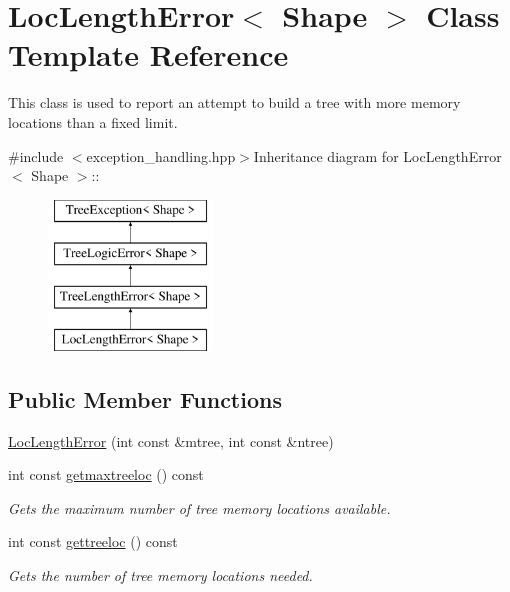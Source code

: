 \hypertarget{classLocLengthError}{
\section{LocLengthError$<$ Shape $>$ Class Template Reference}
\label{classLocLengthError}
}


This class is used to report an attempt to build a tree with more memory locations than a fixed limit.  


{\ttfamily \#include $<$exception\_\-handling.hpp$>$}Inheritance diagram for LocLengthError$<$ Shape $>$::\begin{figure}[H]
\begin{center}
\leavevmode
\includegraphics[height=4cm]{classLocLengthError}
\end{center}
\end{figure}
\subsection*{Public Member Functions}
\begin{DoxyCompactItemize}
\item 
\hyperlink{classLocLengthError_aa99b1f424fc5d9a081269f99ea239230}{LocLengthError} (int const \&mtree, int const \&ntree)
\item 
\hypertarget{classLocLengthError_add45b8c75237409ce118719cc668473b}{
int const \hyperlink{classLocLengthError_add45b8c75237409ce118719cc668473b}{getmaxtreeloc} () const }
\label{classLocLengthError_add45b8c75237409ce118719cc668473b}

\begin{DoxyCompactList}\small\item\em Gets the maximum number of tree memory locations available. \item\end{DoxyCompactList}\item 
\hypertarget{classLocLengthError_a35bc168775794537fe7ffae95c2af138}{
int const \hyperlink{classLocLengthError_a35bc168775794537fe7ffae95c2af138}{gettreeloc} () const }
\label{classLocLengthError_a35bc168775794537fe7ffae95c2af138}

\begin{DoxyCompactList}\small\item\em Gets the number of tree memory locations needed. \item\end{DoxyCompactList}\end{DoxyCompactItemize}

